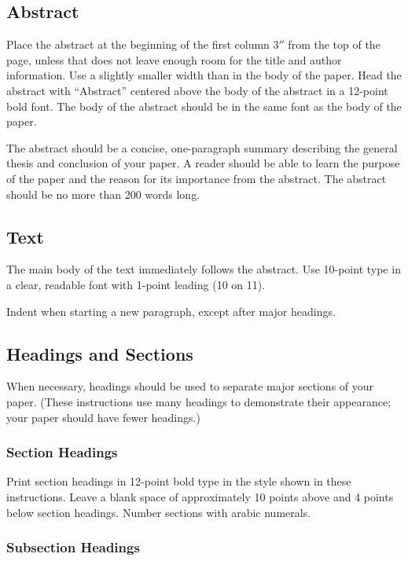 \documentclass{article}
\theoremstyle{definition}
\begin{document}
\subsection{Abstract}

Place the abstract at the beginning of the first column 3$''$ from the
top of the page, unless that does not leave enough room for the title
and author information. Use a slightly smaller width than in the body
of the paper. Head the abstract with ``Abstract'' centered above the
body of the abstract in a 12-point bold font. The body of the abstract
should be in the same font as the body of the paper.

The abstract should be a concise, one-paragraph summary describing the
general thesis and conclusion of your paper. A reader should be able
to learn the purpose of the paper and the reason for its importance
from the abstract. The abstract should be no more than 200 words long.

\subsection{Text}

The main body of the text immediately follows the abstract. Use
10-point type in a clear, readable font with 1-point leading (10 on
11).

Indent when starting a new paragraph, except after major headings.

\subsection{Headings and Sections}

When necessary, headings should be used to separate major sections of
your paper. (These instructions use many headings to demonstrate their
appearance; your paper should have fewer headings.)

\subsubsection{Section Headings}

Print section headings in 12-point bold type in the style shown in
these instructions. Leave a blank space of approximately 10 points
above and 4 points below section headings.  Number sections with
arabic numerals.

\subsubsection{Subsection Headings}
\end{document}
